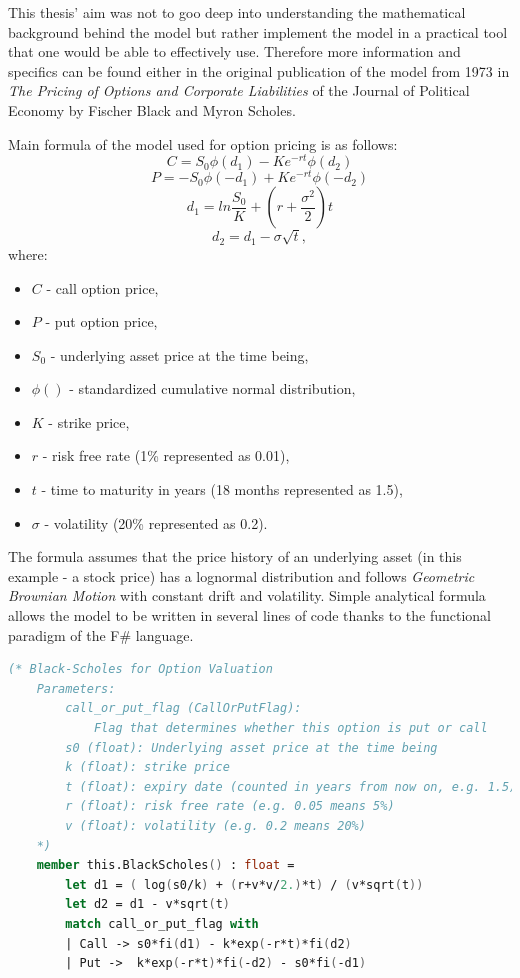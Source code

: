     This thesis' aim was not to goo deep into understanding the mathematical background behind the model but rather implement the model in a practical tool that one would be able to effectively use. Therefore more information and specifics can be found either in the original publication \cite{10.2307/1831029} of the model from 1973 in \textit{The Pricing of Options and Corporate Liabilities} of the Journal of Political Economy by Fischer Black and Myron Scholes.
    
    Main formula of the model used for option pricing is as follows:
    \[
    C = S_0\phi(d_1) - Ke^{-rt}\phi(d_2)
    \]
    \[
    P = -S_0\phi(-d_1) + Ke^{-rt}\phi(-d_2)
    \]
    \[
    d_1 = ln\frac{S_0}{K} + (r+\frac{\sigma^2}{2})t
    \]
    \[
    d_2 = d_1 - \sigma\sqrt{t},
    \]
    where:
    \begin{itemize}
        \item $C$ - call option price,
        \item $P$ - put option price,
        \item $S_0$ - underlying asset price at the time being,
        \item $\phi()$ - standardized cumulative normal distribution,
        \item $K$ - strike price,
        \item $r$ - risk free rate (1\% represented as 0.01),
        \item $t$ - time to maturity in years (18 months represented as 1.5),
        \item $\sigma$ - volatility (20\% represented as 0.2).
    \end{itemize}
    The formula assumes that the price history of an underlying asset (in this example - a stock price) has a lognormal distribution and follows \textit{Geometric Brownian Motion} with constant drift and volatility. 
    Simple analytical formula allows the model to be written in several lines of code thanks to the functional paradigm of the F\# language.
    \begin{lstlisting}[language=FSharp, label={lst:bsm}, caption=F\# implementation of \textit{Black--Scholes Model}.]
    (* Black-Scholes for Option Valuation
    Parameters:
        call_or_put_flag (CallOrPutFlag):
            Flag that determines whether this option is put or call
        s0 (float): Underlying asset price at the time being
        k (float): strike price
        t (float): expiry date (counted in years from now on, e.g. 1.5)
        r (float): risk free rate (e.g. 0.05 means 5%)
        v (float): volatility (e.g. 0.2 means 20%)
    *)
    member this.BlackScholes() : float =
        let d1 = ( log(s0/k) + (r+v*v/2.)*t) / (v*sqrt(t))
        let d2 = d1 - v*sqrt(t)
        match call_or_put_flag with
        | Call -> s0*fi(d1) - k*exp(-r*t)*fi(d2)
        | Put ->  k*exp(-r*t)*fi(-d2) - s0*fi(-d1)
    \end{lstlisting}